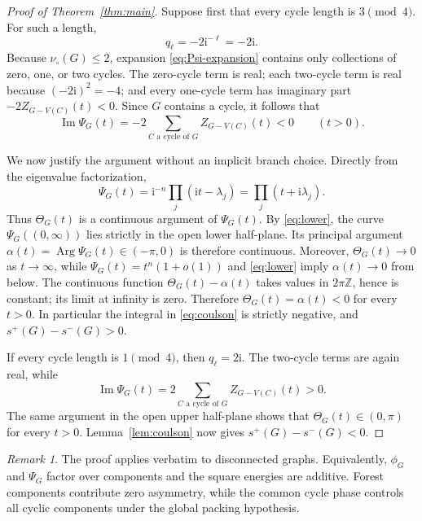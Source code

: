 \documentclass[11pt]{article}
\theoremstyle{definition}
\theoremstyle{remark}
\newtheorem{remark}[theorem]{Remark}
\newcommand{\ii}{\mathrm{i}}
\newcommand{\Arg}{\operatorname{Arg}}
\newcommand{\vp}{\nu_{\circ}}
\begin{document}
\begin{proof}[Proof of Theorem~\ref{thm:main}]
Suppose first that every cycle length is $3\pmod4$.  For such a length,
\[
 q_\ell=-2\ii^{-\ell}=-2\ii.
\]
Because $\vp(G)\le2$, expansion \eqref{eq:Psi-expansion} contains only
collections of zero, one, or two cycles.  The zero-cycle term is real;
each two-cycle term is real because $(-2\ii)^2=-4$; and every one-cycle
term has imaginary part
$-2Z_{G-V(C)}(t)<0$.  Since $G$ contains a cycle, it follows that
\begin{equation}\label{eq:lower}
 \operatorname{Im}\Psi_G(t)
 =-2\sum_{C\text{ a cycle of }G}Z_{G-V(C)}(t)<0
 \qquad(t>0).
\end{equation}

We now justify the argument without an implicit branch choice.  Directly
from the eigenvalue factorization,
\begin{equation}\label{eq:factor}
 \Psi_G(t)=\ii^{-n}\prod_j(\ii t-\lambda_j)
 =\prod_j(t+\ii\lambda_j).
\end{equation}
Thus $\Theta_G(t)$ is a continuous argument of $\Psi_G(t)$.  By
\eqref{eq:lower}, the curve $\Psi_G((0,\infty))$ lies strictly in the
open lower half-plane.  Its principal argument
$\alpha(t)=\Arg\Psi_G(t)\in(-\pi,0)$ is therefore continuous.  Moreover,
$\Theta_G(t)\to0$ as $t\to\infty$, while
$\Psi_G(t)=t^n(1+o(1))$ and \eqref{eq:lower} imply
$\alpha(t)\to0$ from below.  The continuous function
$\Theta_G(t)-\alpha(t)$ takes values in $2\pi\mathbb Z$, hence is
constant; its limit at infinity is zero.  Therefore
$\Theta_G(t)=\alpha(t)<0$ for every $t>0$.  In particular the integral in
\eqref{eq:coulson} is strictly negative, and
$s^+(G)-s^-(G)>0$.

If every cycle length is $1\pmod4$, then $q_\ell=2\ii$.  The two-cycle
terms are again real, while
\[
 \operatorname{Im}\Psi_G(t)
 =2\sum_{C\text{ a cycle of }G}Z_{G-V(C)}(t)>0.
\]
The same argument in the open upper half-plane shows that
$\Theta_G(t)\in(0,\pi)$ for every $t>0$.  Lemma~\ref{lem:coulson} now
gives $s^+(G)-s^-(G)<0$.
\end{proof}

\begin{remark}\label{rem:disconnected}
The proof applies verbatim to disconnected graphs.  Equivalently,
$\phi_G$ and $\Psi_G$ factor over components and the square energies are
additive.  Forest components contribute zero asymmetry, while the common
cycle phase controls all cyclic components under the global packing
hypothesis.
\end{remark}
\end{document}
